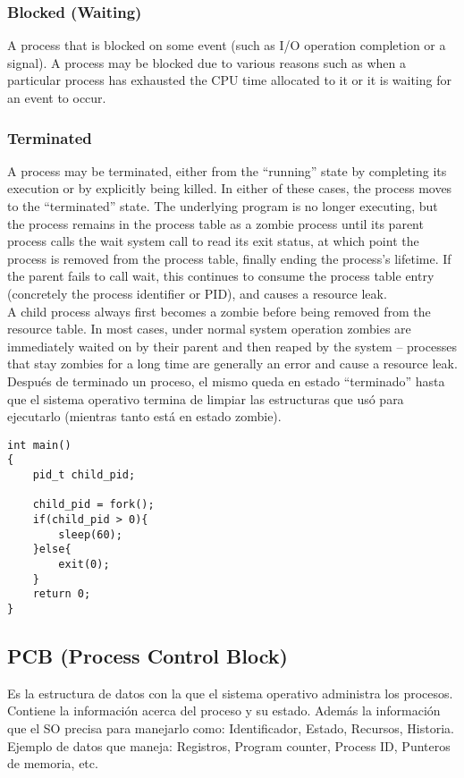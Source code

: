 \documentclass[a4paper, twoside]{article}
\begin{document}
\subsubsection{Blocked (Waiting)}
A process that is blocked on some event (such as I/O operation completion or
a signal).
A process may be blocked due to various reasons such as when a particular
process has exhausted the CPU time allocated to it or it is waiting for an
event to occur.

\subsubsection{Terminated}
A process may be terminated, either from the ``running'' state by completing
its execution or by explicitly being killed.
In either of these cases, the process moves to the ``terminated'' state.
The underlying program is no longer executing, but the process remains in the
process table as a zombie process until its parent process calls the wait
system call to read its exit status, at which point the process is removed from
the process table, finally ending the process's lifetime.
If the parent fails to call wait, this continues to consume the process table
entry (concretely the process identifier or PID), and causes a resource leak.\\

A child process always first becomes a zombie before being removed from the
resource table.
In most cases, under normal system operation zombies are immediately waited on
by their parent and then reaped by the system – processes that stay zombies for
a long time are generally an error and cause a resource leak.\\

Después de terminado un proceso, el mismo queda en estado ``terminado'' hasta
que el sistema operativo termina de limpiar las estructuras que usó para
ejecutarlo (mientras tanto está en estado zombie).

\begin{lstlisting}
int main()
{
	pid_t child_pid;

	child_pid = fork();
	if(child_pid > 0){
		sleep(60);
	}else{
		exit(0);
	}
	return 0;
}
\end{lstlisting}

\subsection{PCB (Process Control Block)}

Es la estructura de datos con la que el sistema operativo administra los
procesos.
Contiene la información acerca del proceso y su estado.
Además la información que el SO precisa para manejarlo como: Identificador,
Estado, Recursos, Historia.
Ejemplo de datos que maneja: Registros, Program counter, Process ID, Punteros
de memoria, etc.
\end{document}
